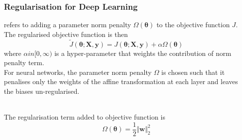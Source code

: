 \subsubsection{Regularisation for Deep Learning}

\begin{definition}  refers to adding a parameter norm penalty $\Omega(\bm{\theta})$ to the objective function $J$. The regularised objective function is then
\begin{equation}
\tilde{J}(\bm{\theta}; \bm{X}, \bm{y}) = J(\bm{\theta}; \bm{X}, \bm{y}) + \alpha \Omega(\bm{\theta}) \nonumber
\end{equation}
where $\alpha in [0, \infty)$ is a hyper-parameter that weights the contribution of norm penalty term.\\
For neural networks, the parameter norm penalty $\Omega$ is chosen such that it penalises only the weights of the affine transformation at each layer and leaves the biases un-regularised.
\end{definition}

\begin{definition} \\
The regularisation term added to objective function is
\begin{equation}
\Omega(\bm{\theta}) = \frac{1}{2} \Vert \bm{w} \Vert^2_2 \nonumber
\end{equation}
\end{definition}

